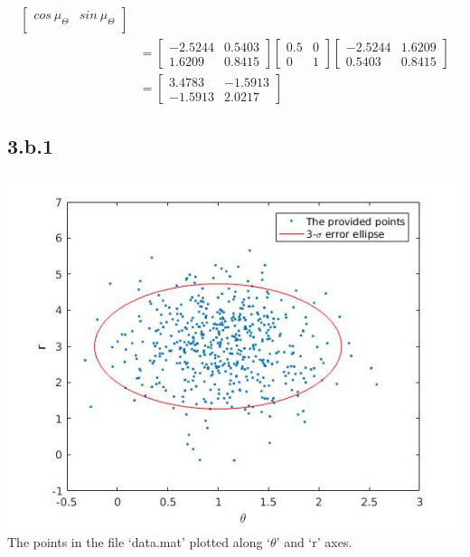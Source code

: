 \documentclass[a4paper,fleqn,11pt]{article}
\theoremstyle{mytheor}
\begin{document}
\begin{align*}
\begin{bmatrix}
		 cos\ \mu_\Theta	    & sin\ \mu_\Theta \\
    \end{bmatrix} \\
& = \begin{bmatrix}
		-2.5244 & 0.5403 \\
		 1.6209 & 0.8415
    \end{bmatrix}
    \begin{bmatrix}
	   0.5 & 0 \\
	   0   & 1
    \end{bmatrix}
    \begin{bmatrix}
		-2.5244 & 1.6209 \\
		 0.5403 & 0.8415
    \end{bmatrix} \\
& = \begin{bmatrix}
		 3.4783 & -1.5913 \\
	    -1.5913 &  2.0217
	\end{bmatrix}
\end{align*}

\subsection*{3.b.1}

\begin{center}
\includegraphics[scale = 0.74]{../images/q3orig.jpg} \\
The points in the file `data.mat' plotted along `$\theta$' and `r' axes.
\end{center}
\end{document}
